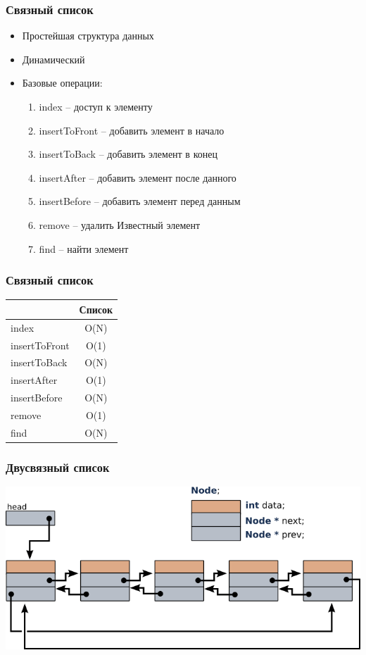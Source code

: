 \documentclass[14pt,pdf,hyperref={unicode}]{beamer}
\begin{document}
\begin{frame}[fragile]
\frametitle{Связный список}
\begin{itemize}
\item Простейшая структура данных \\
\item Динамический \\
\item Базовые операции:
\begin{enumerate}
\item index  --  доступ к элементу
\item insertToFront --  добавить элемент в начало
\item insertToBack --  добавить элемент в конец
\item insertAfter  --  добавить элемент после данного
\item insertBefore  --  добавить элемент перед данным
\item remove --  удалить Известный элемент
\item find   --  найти элемент
\end{enumerate}
\end{itemize}
\end{frame}


\begin{frame}[fragile]
\frametitle{Связный список}
\begin{center}
  \begin{tabular}{  l | c }
      & Список \\
    \hline
    index & O(N) \\
    insertToFront & O(1)  \\
    insertToBack & O(N)  \\
    insertAfter & O(1)  \\
    insertBefore & O(N)  \\
    remove & O(1) \\
    find & O(N)  \\
    \hline
  \end{tabular}
\end{center}
\end{frame}


\begin{frame}[fragile]
\frametitle{Двусвязный список} 
\begin{center}
\includegraphics[width=0.99\linewidth]{images/2linked_list.png}
\end{center}
\end{frame}
\end{document}
